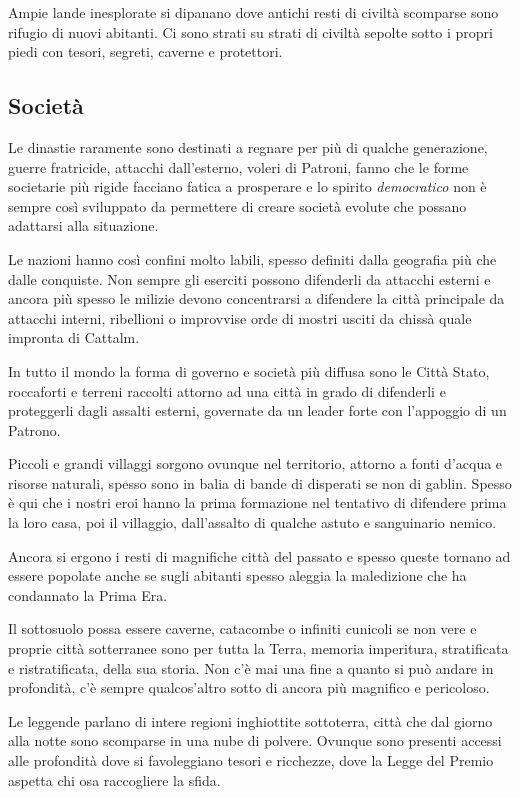 \begin{multicols}{2}
Ampie lande inesplorate si dipanano dove antichi resti di civiltà scomparse sono rifugio di nuovi abitanti. Ci sono strati su strati di civiltà sepolte sotto i propri piedi con tesori, segreti, caverne e protettori.


\subsection{Società}\label{societasullaterra}

Le dinastie raramente sono destinati a regnare per più di qualche generazione, guerre fratricide, attacchi dall'esterno, voleri di Patroni, fanno che le forme societarie più rigide facciano fatica a prosperare e lo spirito \emph{democratico} non è sempre così sviluppato da permettere di creare società evolute che possano adattarsi alla situazione.

Le nazioni hanno così confini molto labili, spesso definiti dalla geografia più che dalle conquiste. Non sempre gli eserciti possono difenderli da attacchi esterni e ancora più spesso le milizie devono concentrarsi a difendere la città principale da attacchi interni, ribellioni o improvvise orde di mostri usciti da chissà quale impronta di Cattalm.

In tutto il mondo la forma di governo e società più diffusa sono le Città Stato, roccaforti e terreni raccolti attorno ad una città in grado di difenderli e proteggerli dagli assalti esterni, governate da un leader forte con l'appoggio di un Patrono.

Piccoli e grandi villaggi sorgono ovunque nel territorio, attorno a fonti d'acqua e risorse naturali, spesso sono in balia di bande di disperati se non di gablin.
Spesso è qui che i nostri eroi hanno la prima formazione nel tentativo di difendere prima la loro casa, poi il villaggio, dall'assalto di qualche astuto e sanguinario nemico.

Ancora si ergono i resti di magnifiche città del passato e spesso queste tornano ad essere popolate anche se sugli abitanti spesso aleggia la maledizione che ha condannato la Prima Era.

Il sottosuolo possa essere caverne, catacombe o infiniti cunicoli se non vere e proprie città sotterranee sono per tutta la Terra, memoria imperitura, stratificata e ristratificata, della sua storia. Non c'è mai una fine a quanto si può andare in profondità, c'è sempre qualcos'altro sotto di ancora più magnifico e pericoloso.

Le leggende parlano di intere regioni inghiottite sottoterra, città che dal giorno alla notte sono scomparse in una nube di polvere. Ovunque sono presenti accessi alle profondità dove si favoleggiano tesori e ricchezze, dove la Legge del Premio aspetta chi osa raccogliere la sfida.


\end{multicols}
